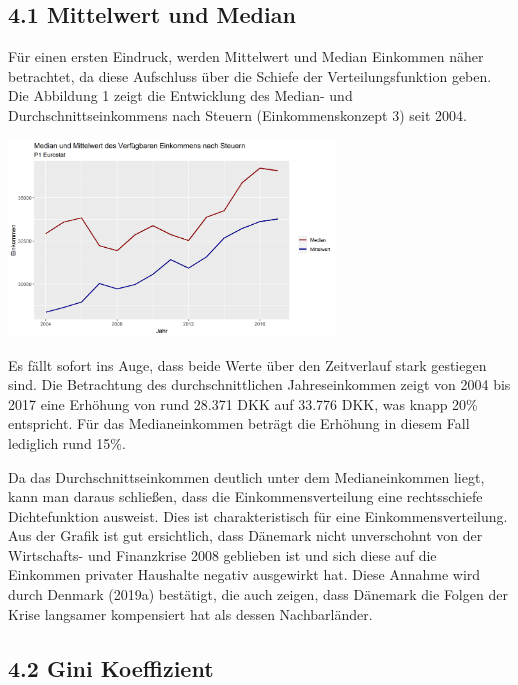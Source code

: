 \documentclass[ngerman,]{article}
\let\origfigure\figure
\let\endorigfigure\endfigure
\renewenvironment{figure}[1][2] {
        \expandafter\origfigure\expandafter[H]
      } {\endorigfigure}
\begin{document}
\subsection{4.1 Mittelwert und Median}\label{mittelwert-und-median}

Für einen ersten Eindruck, werden Mittelwert und Median Einkommen näher
betrachtet, da diese Aufschluss über die Schiefe der Verteilungsfunktion
geben. Die Abbildung 1 zeigt die Entwicklung des Median- und
Durchschnittseinkommens nach Steuern (Einkommenskonzept 3) seit 2004.

\begin{figure}
\centering
\includegraphics[width=0.65000\textwidth]{img/medmit.png}
\caption{Median und Mittelwert, 2004-2017}
\end{figure}

Es fällt sofort ins Auge, dass beide Werte über den Zeitverlauf stark
gestiegen sind. Die Betrachtung des durchschnittlichen Jahreseinkommen
zeigt von 2004 bis 2017 eine Erhöhung von rund 28.371 DKK auf 33.776
DKK, was knapp 20\% entspricht. Für das Medianeinkommen beträgt die
Erhöhung in diesem Fall lediglich rund 15\%.

Da das Durchschnittseinkommen deutlich unter dem Medianeinkommen liegt,
kann man daraus schließen, dass die Einkommensverteilung eine
rechtsschiefe Dichtefunktion ausweist. Dies ist charakteristisch für
eine Einkommensverteilung. Aus der Grafik ist gut ersichtlich, dass
Dänemark nicht unverschohnt von der Wirtschafts- und Finanzkrise 2008
geblieben ist und sich diese auf die Einkommen privater Haushalte
negativ ausgewirkt hat. Diese Annahme wird durch Denmark (2019a)
bestätigt, die auch zeigen, dass Dänemark die Folgen der Krise langsamer
kompensiert hat als dessen Nachbarländer.

\subsection{4.2 Gini Koeffizient}\label{gini-koeffizient}
\end{document}

